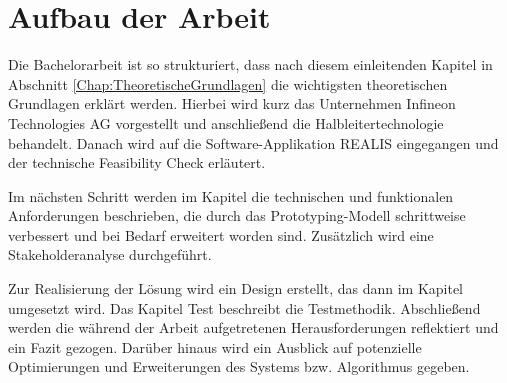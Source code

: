 \section{Aufbau der Arbeit}
Die Bachelorarbeit ist so strukturiert, dass nach diesem einleitenden Kapitel in Abschnitt \ref{Chap:TheoretischeGrundlagen} die wichtigsten theoretischen Grundlagen erklärt werden. 
Hierbei wird kurz das Unternehmen Infineon Technologies AG vorgestellt und anschließend die Halbleitertechnologie behandelt. Danach wird auf die Software-Applikation \gls{REALIS} eingegangen und der technische Feasibility Check erläutert.

Im nächsten Schritt werden im Kapitel \textit{} die technischen und funktionalen Anforderungen beschrieben, die durch das Prototyping-Modell schrittweise verbessert und bei Bedarf erweitert worden sind. Zusätzlich wird eine Stakeholderanalyse durchgeführt.

Zur Realisierung der Lösung wird ein Design erstellt, das dann im Kapitel \textit{} umgesetzt wird. Das Kapitel Test beschreibt die Testmethodik. Abschließend werden die während der Arbeit aufgetretenen Herausforderungen reflektiert und ein Fazit gezogen. Darüber hinaus wird ein Ausblick auf potenzielle Optimierungen und Erweiterungen des Systems bzw. Algorithmus gegeben.